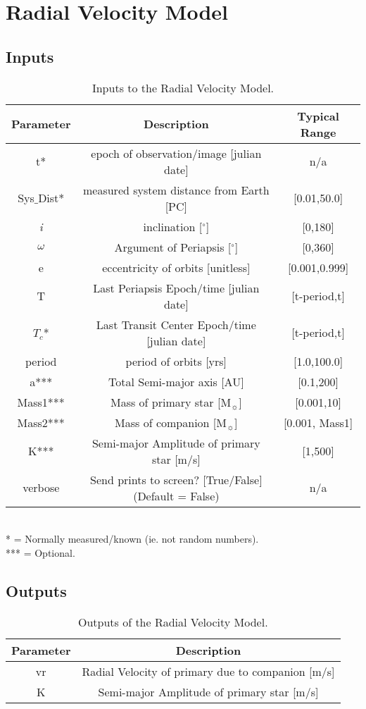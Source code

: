 \documentclass[10pt,preprint]{aastex}
\begin{document}
\section{Radial Velocity Model}
\subsection{Inputs}
\begin{table}[h]
\centering
\caption{ Inputs to the Radial Velocity Model.}
\begin{tabular}{c c c}
\hline\hline
Parameter & Description & Typical Range \\
\hline
t* & epoch of observation/image [julian date] & n/a\\
Sys$\_$Dist* & measured system distance from Earth [PC] &  [0.01,50.0]\\
{\it i} & inclination [$^{\circ}$] & [0,180]\\
$\omega$ & Argument of Periapsis [$^{\circ}$] & [0,360]\\
e & eccentricity of orbits [unitless] & [0.001,0.999]\\
T & Last Periapsis Epoch/time [julian date] & [t-period,t]\\
$T_c$* & Last Transit Center Epoch/time [julian date] & [t-period,t]\\
period & period of orbits [yrs] & [1.0,100.0]\\
a*** & Total Semi-major axis [AU]  & [0.1,200] \\
Mass1*** & Mass of primary star [M$_{\sun}$] & [0.001,10] \\
Mass2*** & Mass of companion [M$_{\sun}$] & [0.001, Mass1] \\
K*** & Semi-major Amplitude of primary star [m/s]& [1,500]\\
verbose & Send prints to screen? [True/False](Default = False) & n/a\\
\hline
\end{tabular}
\\
  * = Normally measured/known (ie. not random numbers).\\
 *** = Optional.
\end{table}

\subsection{Outputs}

\begin{table}[h]
\centering
\caption{ Outputs of the Radial Velocity Model.}
\begin{tabular}{c c}
\hline\hline
Parameter & Description \\
\hline
vr & Radial Velocity of primary due to companion [m/s] \\
K & Semi-major Amplitude of primary star [m/s]\\
\hline
\end{tabular}
\end{table}
\end{document}
